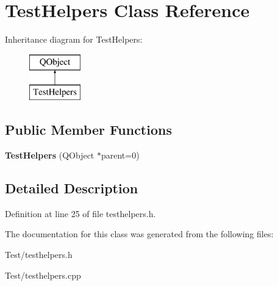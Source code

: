 \hypertarget{class_test_helpers}{}\section{Test\+Helpers Class Reference}
\label{class_test_helpers}
Inheritance diagram for Test\+Helpers\+:\begin{figure}[H]
\begin{center}
\leavevmode
\includegraphics[height=2.000000cm]{class_test_helpers}
\end{center}
\end{figure}
\subsection*{Public Member Functions}
\begin{DoxyCompactItemize}
\item 
{\bfseries Test\+Helpers} (Q\+Object $\ast$parent=0)\hypertarget{class_test_helpers_ac8b9cd84d48941f1f1bda84c254f7fb7}{}\label{class_test_helpers_ac8b9cd84d48941f1f1bda84c254f7fb7}

\end{DoxyCompactItemize}


\subsection{Detailed Description}


Definition at line 25 of file testhelpers.\+h.



The documentation for this class was generated from the following files\+:\begin{DoxyCompactItemize}
\item 
Test/testhelpers.\+h\item 
Test/testhelpers.\+cpp\end{DoxyCompactItemize}
